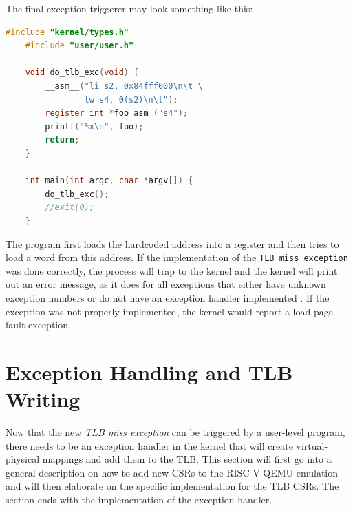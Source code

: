 The final exception triggerer may look something like this:
\begin{lstlisting}[language=c,float=h!,label={impl:excptTrigger},basicstyle=\footnotesize,caption={\textbf{Exception Triggerer} Trying to
    load from a hardcoded address prompts the emulated hardware to trigger a TLB miss exception.}]
    #include "kernel/types.h"
    #include "user/user.h"

    void do_tlb_exc(void) {
        __asm__("li s2, 0x84fff000\n\t \
                lw s4, 0(s2)\n\t");
        register int *foo asm ("s4");
        printf("%x\n", foo);
        return;
    }

    int main(int argc, char *argv[]) {
        do_tlb_exc();
        //exit(0);
    }
\end{lstlisting}



The program first loads the hardcoded address into a register and then tries to load a word from this address.
If the implementation of the \texttt{TLB miss exception} was done correctly, the process will trap to the kernel
and the kernel will print out an error message, as it does for all exceptions that either have unknown exception
numbers or do not have an exception handler implemented \cite{cox2011xv6}.
If the exception was not properly implemented, the kernel would report a load page fault exception.




\section{Exception Handling and TLB Writing}
\label{sect:tlbwrite}

Now that the new \textit{TLB miss exception} can be triggered by a user-level program, there needs
to be an exception handler in the kernel that will create virtual-physical mappings and add them to the
TLB.
This section will first go into a general description on how to add new CSRs to the RISC-V QEMU emulation and
will then elaborate on the specific implementation for the TLB CSRs.
The section ends with the implementation of the exception handler.



